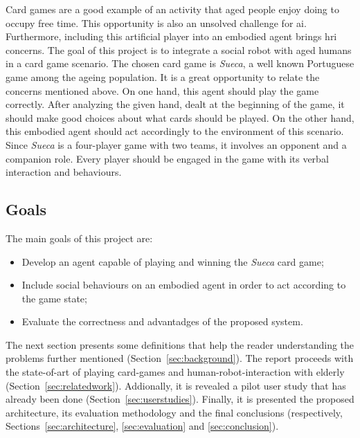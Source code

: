 Card games are a good example of an activity that aged people enjoy doing to occupy free time.
This opportunity is also an unsolved challenge for \gls{ai}.
Furthermore, including this artificial player into an embodied agent brings \gls{hri} concerns.
The goal of this project is to integrate a social robot with aged humans in a card game scenario.
The chosen card game is \emph{Sueca}, a well known Portuguese game among the ageing population.
It is a great opportunity to relate the concerns mentioned above.
On one hand, this agent should play the game correctly.
After analyzing the given hand, dealt at the beginning of the game, it should make good choices about what cards should be played.
On the other hand, this embodied agent should act accordingly to the environment of this scenario.
Since \emph{Sueca} is a four-player game with two teams, it involves an opponent and a companion role.
Every player should be engaged in the game with its verbal interaction and behaviours.


\subsection{Goals}
\label{sec:goals}

The main goals of this project are:
\begin{itemize}
\item Develop an agent capable of playing and winning the \emph{Sueca} card game;
\item Include social behaviours on an embodied agent in order to act according to the game state;
\item Evaluate the correctness and advantadges of the proposed system.
\end{itemize}



The next section presents some definitions that help the reader understanding the problems further mentioned (Section~\ref{sec:background}).
The report proceeds with the state-of-art of playing card-games and human-robot-interaction with elderly (Section~\ref{sec:relatedwork}).
Addionally, it is revealed a pilot user study that has already been done (Section~\ref{sec:userstudies}).
Finally, it is presented the proposed architecture, its evaluation methodology and the final conclusions (respectively, Sections~\ref{sec:architecture}, \ref{sec:evaluation} and \ref{sec:conclusion}).


